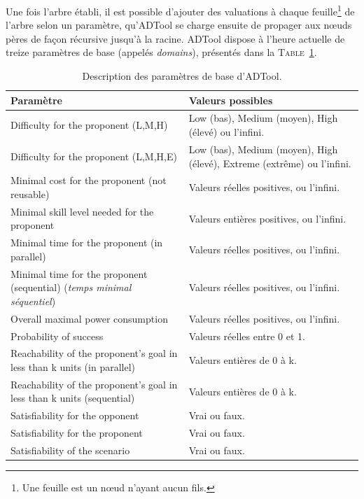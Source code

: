 	Une fois l'arbre établi, il est possible d'ajouter des valuations à chaque feuille\footnote{Une feuille est un nœud n'ayant aucun fils.} de l'arbre selon un paramètre, qu'ADTool se charge ensuite de propager aux nœuds pères de façon récursive jusqu'à la racine. ADTool dispose à l'heure actuelle de treize paramètres de base (appelés \textit{domains}), présentés dans la \textsc{Table}~\ref{tab:DescriptionParam}.
					
	\begin{table}[h]
		\centering
		\begin{tabular}{|p{6cm}|p{5cm}|}
			\hline
			\textbf{Paramètre} & \textbf{Valeurs possibles} \\
			\hline
			Difficulty for the proponent (L,M,H) & 
				Low (bas), Medium (moyen), High (élevé) ou l'infini.\\ 
			\hline
			Difficulty for the proponent (L,M,H,E) & 
				Low (bas), Medium (moyen), High (élevé), Extreme (extrême) ou l'infini.\\ 
			\hline
			Minimal cost for the proponent (not reusable) & 
				Valeurs réelles positives, ou l'infini.\\ 
			\hline
			Minimal skill level needed for the proponent & 
				Valeurs entières positives, ou l'infini.\\ 
			\hline
			Minimal time for the proponent (in parallel) & 
				Valeurs réelles positives, ou l'infini.\\ 
			\hline
			Minimal time for the proponent (sequential) (\textit{temps minimal séquentiel}) & 
				Valeurs réelles positives, ou l'infini.\\ 
			\hline
			Overall maximal power consumption & 
				Valeurs réelles positives, ou l'infini.\\ 
			\hline
			Probability of success &
				Valeurs réelles entre 0 et 1.\\ 
			\hline
			Reachability of the proponent's goal in less than k units (in parallel) & 
				Valeurs entières de 0 à k. \\ 
			\hline
			Reachability of the proponent's goal in less than k units (sequential) & 
				Valeurs entières de 0 à k. \\ 
			\hline
			Satisfiability for the opponent & 
				Vrai ou faux. \\ 
			\hline
			Satisfiability for the proponent & 
				Vrai ou faux. \\ 
			\hline
			Satisfiability of the scenario & 
				Vrai ou faux. \\
			\hline
		\end{tabular}
		\caption{Description des paramètres de base d'ADTool.}
		\label{tab:DescriptionParam}
	\end{table}


